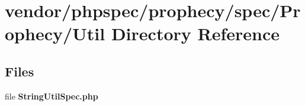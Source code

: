\section{vendor/phpspec/prophecy/spec/\+Prophecy/\+Util Directory Reference}
\label{dir_962d123a4c1ddb3a401a6887f78aa6e9}
\subsection*{Files}
\begin{DoxyCompactItemize}
\item 
file {\bf String\+Util\+Spec.\+php}
\end{DoxyCompactItemize}

